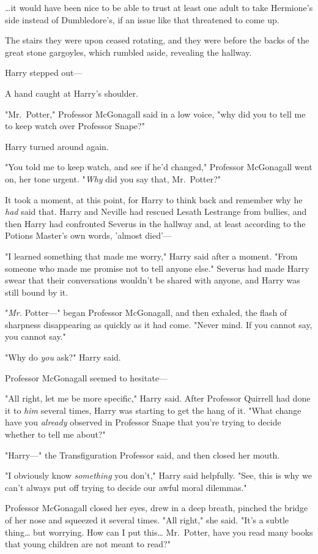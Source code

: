 {\ldots}it would have been nice to be able to trust at least one adult to take Hermione's side instead of Dumbledore's, if an issue like that threatened to come up.

The stairs they were upon ceased rotating, and they were before the backs of the great stone gargoyles, which rumbled aside, revealing the hallway.

Harry stepped out---

A hand caught at Harry's shoulder.

"Mr.~Potter," Professor McGonagall said in a low voice, "why did you to tell me to keep watch over Professor Snape?"

Harry turned around again.

"You told me to keep watch, and see if he'd changed," Professor McGonagall went on, her tone urgent. "\emph{Why} did you say that, Mr.~Potter?"

It took a moment, at this point, for Harry to think back and remember why he \emph{had} said that. Harry and Neville had rescued Lesath Lestrange from bullies, and then Harry had confronted Severus in the hallway and, at least according to the Potions Master's own words, 'almost died'---

"I learned something that made me worry," Harry said after a moment. "From someone who made me promise not to tell anyone else." Severus had made Harry swear that their conversations wouldn't be shared with anyone, and Harry was still bound by it.

"\emph{Mr.} Potter---" began Professor McGonagall, and then exhaled, the flash of sharpness disappearing as quickly as it had come. "Never mind. If you cannot say, you cannot say."

"Why do \emph{you} ask?" Harry said.

Professor McGonagall seemed to hesitate---

"All right, let me be more specific," Harry said. After Professor Quirrell had done it to \emph{him} several times, Harry was starting to get the hang of it. "What change have you \emph{already} observed in Professor Snape that you're trying to decide whether to tell me about?"

"Harry---" the Transfiguration Professor said, and then closed her mouth.

"I obviously know \emph{something} you don't," Harry said helpfully. "See, this is why we can't always put off trying to decide our awful moral dilemmas."

Professor McGonagall closed her eyes, drew in a deep breath, pinched the bridge of her nose and squeezed it several times. "All right," she said. "It's a subtle thing{\ldots} but worrying. How can I put this{\ldots} Mr.~Potter, have you read many books that young children are not meant to read?"

